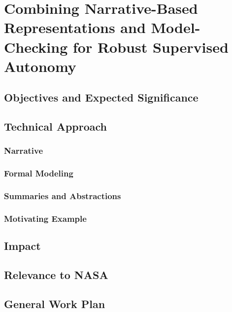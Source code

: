 \documentclass[palatinofont10]{nsfprop}
\begin{document}
\section{\large Combining Narrative-Based Representations and Model-Checking for Robust Supervised Autonomy}


\vspace{-1ex}
\subsection{Objectives and Expected Significance}

\vspace{-1ex}
\subsection{Technical Approach}
\subsubsection{Narrative}

\subsubsection{Formal Modeling}

\subsubsection{Summaries and Abstractions}

\subsubsection{Motivating Example}


\vspace{-1ex}
\subsection{Impact}

\vspace{-1ex}
\subsection{Relevance to NASA}

\vspace{-1ex}
\subsection{General Work Plan}
\end{document}
